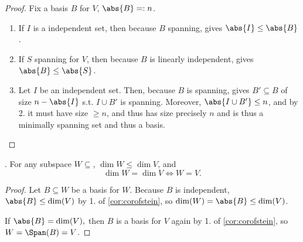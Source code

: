 \begin{proof}
    Fix a basis $B$ for $V$, $\abs{B} =: n$.
    \begin{enumerate}
        \item If $I$ is a independent set, then because $B$ spanning,  gives $\abs{I} \leq \abs{B}$.
        \item If $S$ spanning for $V$, then because $B$ is linearly independent,  gives $\abs{B} \leq \abs{S}$.
        \item Let $I$ be an independent set. Then, because $B$ is spanning,  gives $B' \subseteq B$ of size $n - \abs{I}$ s.t. $I \cup B'$ is spanning. Moreover, $\abs{I \cup B'} \leq n$, and by 2. it must have size $\geq n$, and thus has size precisely $n$ and is thus a minimally spanning set and thus a basis.
    \end{enumerate}
\end{proof}

\begin{corollary}
     . For any subspace $W \subseteq $, $\dim W \leq \dim V$, and $$\dim W = \dim V \iff W = V.$$
\end{corollary}

\begin{proof}
    Let $B \subseteq W$ be a basis for $W$. Because $B$ is independent, $\abs{B} \leq \dim (V)$ by 1. of \cref{cor:corofstein}, so $\dim (W) = \abs{B} \leq \dim (V)$.

    If $\abs{B} = \dim (V),$ then $B$ is a basis for $V$ again by 1. of \cref{cor:corofstein}, so $W = \Span (B) = V$.
\end{proof}